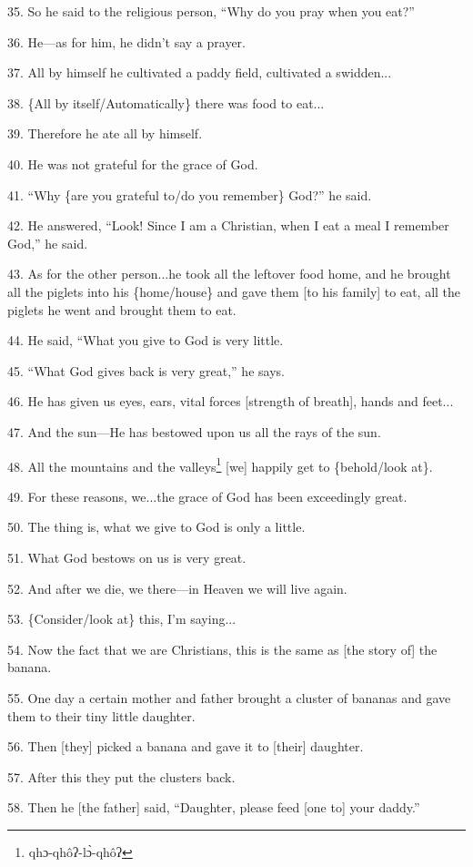 35. So he said to the religious person, ``Why do you pray when you eat?''

36. He---as for him, he didn't say a prayer.

37. All by himself he cultivated a paddy field, cultivated a swidden...

38. \{All by itself/Automatically\} there was food to eat...

39. Therefore he ate all by himself.

40. He was not grateful for the grace of God.

41. ``Why \{are you grateful to/do you remember\} God?'' he said.

42. He answered, ``Look! Since I am a Christian, when I eat a meal I remember God,''
he said.

43. As for the other person...he took all the leftover food home, and he brought
all the piglets into his \{home/house\} and gave them [to his family] to eat, all
the piglets he went and brought them to eat.

44. He said, ``What you give to God is very little.

45. ``What God gives back is very great,'' he says.

46. He has given us eyes, ears, vital forces [strength of breath], hands and feet...

47. And the sun---He has bestowed upon us all the rays of the sun.

48. All the mountains and the valleys\footnote{qhɔ-qhôʔ-lɔ̀-qhôʔ} [we] happily get to \{behold/look at\}.

49. For these reasons, we...the grace of God has been exceedingly great.

50. The thing is, what we give to God is only a little.

51. What God bestows on us is very great.

52. And after we die, we there---in Heaven we will live again.

53. \{Consider/look at\} this, I'm saying...

54. Now the fact that we are Christians, this is the same as [the story of] the
banana.

55. One day a certain mother and father brought a cluster of bananas and gave them
to their tiny little daughter.

56. Then [they] picked a banana and gave it to [their] daughter.

57. After this they put the clusters back.

58. Then he [the father] said, ``Daughter, please feed [one to] your daddy.''

